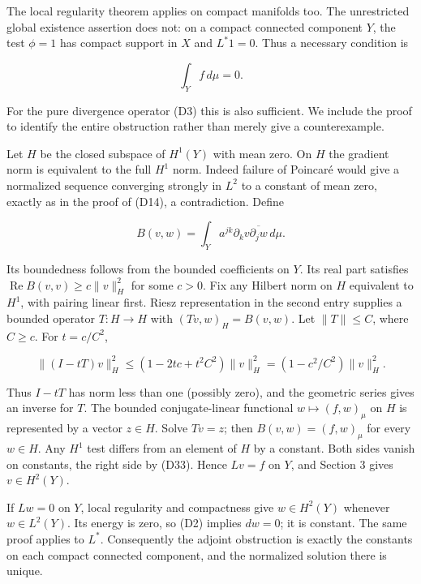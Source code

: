\documentclass[
  11pt,
]{article}
\begin{document}
The local regularity theorem applies on compact manifolds too. The
unrestricted global existence assertion does not: on a compact connected
component \(Y\), the test \(\phi=1\) has compact support in \(X\) and
\(L^*1=0\). Thus a necessary condition is

\[
                              \int_Y f\,d\mu=0.                 \tag{D33}
\]

For the pure divergence operator (D3) this is also sufficient. We
include the proof to identify the entire obstruction rather than merely
give a counterexample.

Let \(H\) be the closed subspace of \(H^1(Y)\) with mean zero. On \(H\)
the gradient norm is equivalent to the full \(H^1\) norm. Indeed failure
of Poincaré would give a normalized sequence converging strongly in
\(L^2\) to a constant of mean zero, exactly as in the proof of (D14), a
contradiction. Define

\[
                  B(v,w)=\int_Y a^{jk}\partial_kv
                                      \overline{\partial_jw}\,d\mu.
                                                                    \tag{D34}
\]

Its boundedness follows from the bounded coefficients on \(Y\). Its real
part satisfies \(\operatorname{Re}B(v,v)\geq c\|v\|_H^2\) for some
\(c>0\). Fix any Hilbert norm on \(H\) equivalent to \(H^1\), with
pairing linear first. Riesz representation in the second entry supplies
a bounded operator \(T:H\to H\) with \((Tv,w)_H=B(v,w)\). Let
\(\|T\|\leq C\), where \(C\geq c\). For \(t=c/C^2\),

\[
 \|(I-tT)v\|_H^2
 \leq(1-2tc+t^2C^2)\|v\|_H^2
 =(1-c^2/C^2)\|v\|_H^2.                                       \tag{D35}
\]

Thus \(I-tT\) has norm less than one (possibly zero), and the geometric
series gives an inverse for \(T\). The bounded conjugate-linear
functional \(w\mapsto(f,w)_\mu\) on \(H\) is represented by a vector
\(z\in H\). Solve \(Tv=z\); then \(B(v,w)=(f,w)_\mu\) for every
\(w\in H\). Any \(H^1\) test differs from an element of \(H\) by a
constant. Both sides vanish on constants, the right side by (D33). Hence
\(Lv=f\) on \(Y\), and Section 3 gives \(v\in H^2(Y)\).

If \(Lw=0\) on \(Y\), local regularity and compactness give
\(w\in H^2(Y)\) whenever \(w\in L^2(Y)\). Its energy is zero, so (D2)
implies \(dw=0\); it is constant. The same proof applies to \(L^*\).
Consequently the adjoint obstruction is exactly the constants on each
compact connected component, and the normalized solution there is
unique.
\end{document}
